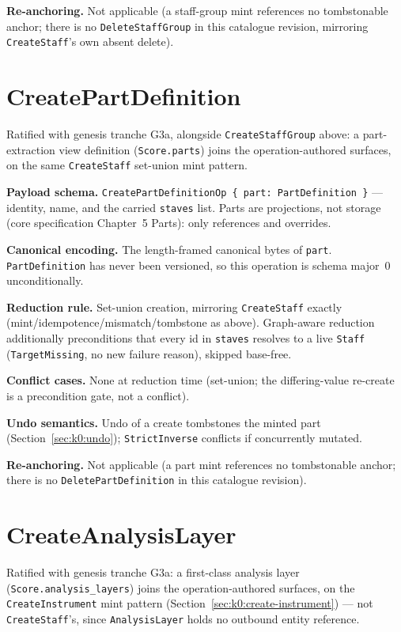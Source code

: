 \documentclass[11pt,letterpaper]{report}
\newcommand{\sectionsc}[1]{{\addfontfeatures{Letters=SmallCaps}#1}}
\begin{document}
\textbf{Re-anchoring.} Not applicable (a staff-group mint references no
tombstonable anchor; there is no \texttt{DeleteStaffGroup} in this catalogue
revision, mirroring \texttt{CreateStaff}'s own absent delete).

\section{CreatePartDefinition}
\label{sec:k0:create-part-definition}

Ratified with genesis tranche G3a, alongside \texttt{CreateStaffGroup} above:
a part-extraction view definition (\texttt{Score.parts}) joins the
operation-authored surfaces, on the same \texttt{CreateStaff} set-union mint
pattern.

\textbf{Payload schema.} \texttt{CreatePartDefinitionOp \{ part:
PartDefinition \}} --- identity, name, and the carried \texttt{staves} list.
Parts are projections, not storage (core specification Chapter~5
\sectionsc{Parts}): only references and overrides.

\textbf{Canonical encoding.} The length-framed canonical bytes of
\texttt{part}. \texttt{PartDefinition} has never been versioned, so this
operation is schema major~0 unconditionally.

\textbf{Reduction rule.} Set-union creation, mirroring \texttt{CreateStaff}
exactly (mint/idempotence/mismatch/tombstone as above). Graph-aware reduction
additionally preconditions that every id in \texttt{staves} resolves to a
live \texttt{Staff} (\texttt{TargetMissing}, no new failure reason), skipped
base-free.

\textbf{Conflict cases.} None at reduction time (set-union; the differing-value
re-create is a precondition gate, not a conflict).

\textbf{Undo semantics.} Undo of a create tombstones the minted part
(Section~\ref{sec:k0:undo}); \texttt{StrictInverse} conflicts if concurrently
mutated.

\textbf{Re-anchoring.} Not applicable (a part mint references no tombstonable
anchor; there is no \texttt{DeletePartDefinition} in this catalogue
revision).

\section{CreateAnalysisLayer}
\label{sec:k0:create-analysis-layer}

Ratified with genesis tranche G3a: a first-class analysis layer
(\texttt{Score.analysis\_layers}) joins the operation-authored surfaces, on
the \texttt{CreateInstrument} mint pattern
(Section~\ref{sec:k0:create-instrument}) --- not \texttt{CreateStaff}'s,
since \texttt{AnalysisLayer} holds no outbound entity reference.
\end{document}

